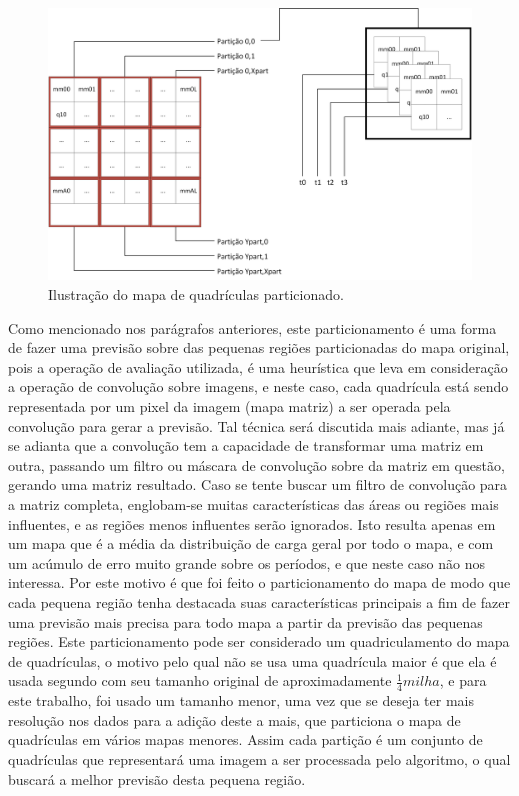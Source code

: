 \begin{figure}[h]
	\centering	\includegraphics[scale=0.6]{Figuras/Ilustrations-PartitionedQuadricMap.png}
	\caption{Ilustração do mapa de quadrículas particionado.}
	\label{fig:PartitionedQuadricMap}
\end{figure}

Como mencionado nos parágrafos anteriores, este particionamento  é uma forma de fazer uma previsão sobre das pequenas regiões particionadas do mapa original, pois a operação de avaliação utilizada, é uma heurística que leva em consideração a operação de convolução sobre imagens, e neste caso, cada quadrícula está sendo representada por um pixel da imagem (mapa matriz) a ser operada pela convolução para gerar a previsão. Tal técnica será discutida mais adiante, mas já se adianta que a convolução tem a capacidade de  transformar uma matriz em outra, passando um filtro ou máscara de convolução sobre da matriz em questão, gerando uma matriz resultado. Caso se tente buscar um filtro de convolução para a matriz completa, englobam-se muitas características das áreas ou regiões mais influentes, e as regiões menos influentes serão ignorados. Isto resulta  apenas em um mapa que é a média da distribuição de carga geral por todo o mapa, e com um acúmulo de erro muito grande sobre os períodos, e que neste caso não nos interessa. Por este motivo é que foi feito o particionamento do mapa de modo que cada pequena região tenha destacada suas características principais a fim de fazer uma previsão mais precisa para todo mapa a partir da previsão das pequenas regiões. Este particionamento pode ser considerado um quadriculamento do mapa de quadrículas, o motivo pelo qual não se usa  uma quadrícula maior é que ela é usada segundo \citeauthor{willis2002spatial}  com seu tamanho original de aproximadamente \(\frac{1}{4} milha\),  e para este trabalho, foi usado um tamanho menor, uma vez que se deseja ter mais resolução nos dados para a adição deste a mais, que particiona o mapa de quadrículas em vários mapas menores. Assim cada  partição é um conjunto de quadrículas que representará uma imagem a ser processada pelo algoritmo, o qual buscará a melhor previsão desta pequena região.


